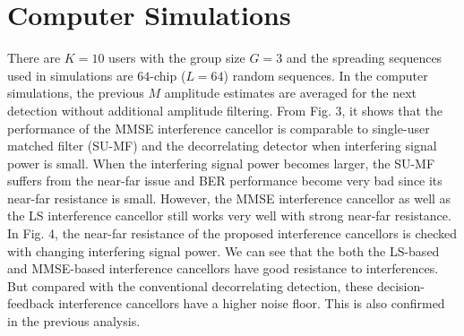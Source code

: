 \documentclass[conference]{IEEEtran}
\begin{document}
\section{Computer Simulations}
There are $K=10$ users with the group size $G=3$ and the spreading
sequences used in simulations are $64$-chip ($L=64$) random
sequences. In the computer simulations, the previous $M$ amplitude
estimates are averaged for the next detection without additional
amplitude filtering. From Fig. 3, it shows that the performance of
the MMSE interference cancellor is comparable to single-user
matched filter (SU-MF) and the decorrelating detector when
interfering signal power is small. When the interfering signal
power becomes larger, the SU-MF suffers from the near-far issue
and BER performance become very bad since its near-far resistance
is small. However, the MMSE interference cancellor as well as the
LS interference cancellor still works very well with strong
near-far resistance. In Fig. 4, the near-far resistance of the
proposed interference cancellors is checked with changing
interfering signal power. We can see that the both the LS-based
and MMSE-based interference cancellors have good resistance to
interferences. But compared with the conventional decorrelating
detection, these decision-feedback interference cancellors have a
higher noise floor. This is also confirmed in the previous
analysis.
\begin{figure}%
\label{BER_SNR}
\end{figure}
\begin{figure} \label{BER_A_SNR}
\end{figure}
\end{document}
